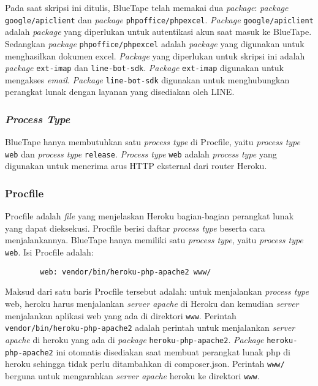 		Pada saat skripsi ini ditulis, BlueTape telah memakai dua \textit{package}: \textit{package} \texttt{google/apiclient} dan \textit{package} \texttt{phpoffice/phpexcel}. \textit{Package} \texttt{google/apiclient} adalah \textit{package} yang diperlukan untuk autentikasi akun saat masuk ke BlueTape. Sedangkan \textit{package} \texttt{phpoffice/phpexcel} adalah \textit{package} yang digunakan untuk menghasilkan dokumen excel. \textit{Package} yang diperlukan untuk skripsi ini adalah \textit{package} \texttt{ext-imap} dan \texttt{line-bot-sdk}. \textit{Package} \texttt{ext-imap} digunakan untuk mengakses \textit{email}. \textit{Package} \texttt{line-bot-sdk} digunakan untuk menghubungkan perangkat lunak dengan layanan yang disediakan oleh LINE.
		
	\subsubsection{\textit{Process Type}}
		BlueTape hanya membutuhkan satu \textit{process type} di Procfile, yaitu \textit{process type} \texttt{web} dan \textit{process type} \texttt{release}. \textit{Process type} \texttt{web} adalah \textit{process type} yang digunakan untuk menerima arus HTTP eksternal dari router Heroku.
		
	\subsubsection{Procfile}
		Procfile adalah \textit{file} yang menjelaskan Heroku bagian-bagian perangkat lunak yang dapat dieksekusi. Procfile berisi daftar \textit{process type} beserta cara menjalankannya. BlueTape hanya memiliki satu \textit{process type}, yaitu \textit{process type} \texttt{web}. Isi Procfile adalah:
		\begin{lstlisting}
		web: vendor/bin/heroku-php-apache2 www/
		\end{lstlisting}
		
		Maksud dari satu baris Procfile tersebut adalah: untuk menjalankan \textit{process type} web, heroku harus menjalankan \textit{server apache} di Heroku dan kemudian \textit{server} menjalankan aplikasi web yang ada di direktori \texttt{www}. Perintah \texttt{vendor/bin/heroku-php-apache2} adalah perintah untuk menjalankan \textit{server apache} di heroku yang ada di \textit{package} \texttt{heroku-php-apache2}. \textit{Package} \texttt{heroku-php-apache2} ini otomatis disediakan saat membuat perangkat lunak php di heroku sehingga tidak perlu ditambahkan di composer.json. Perintah \texttt{www/} berguna untuk mengarahkan \textit{server apache} heroku ke direktori \texttt{www}.
		
